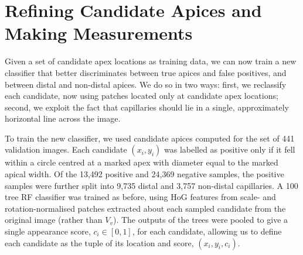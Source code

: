 \documentclass[runningheads,a4paper]{llncs}
\begin{document}
\section{Refining Candidate Apices and Making Measurements}
\label{s:distal_row}
%
Given a set of candidate apex locations as training data, we can now train a new classifier that better discriminates between true apices and false positives, and between distal and non-distal apices. We do so in two ways:
first, we reclassify each candidate, now using patches located only at candidate apex locations;
second, we exploit the fact that capillaries should lie in a single, approximately horizontal line across the image.

To train the new classifier, we used candidate apices computed for the set of 441 validation images. Each candidate $(x_i,y_i)$ was labelled as positive only if it fell within a circle centred at a marked apex with diameter equal to the marked apical width. Of the 13,492 positive and 24,369 negative samples, the positive samples were further split into 9,735 distal and 3,757 non-distal capillaries. %
A 100 tree RF classifier was trained as before, using HoG features from scale- and rotation-normalised patches extracted about each sampled candidate from the original image (rather than $V_v$). The outputs of the trees were pooled to give a single appearance score, $c_i \in [0, 1]$, for each candidate, allowing us to define each candidate as the tuple of its location and score, $(x_i,y_i,c_i)$.
%
\end{document}
